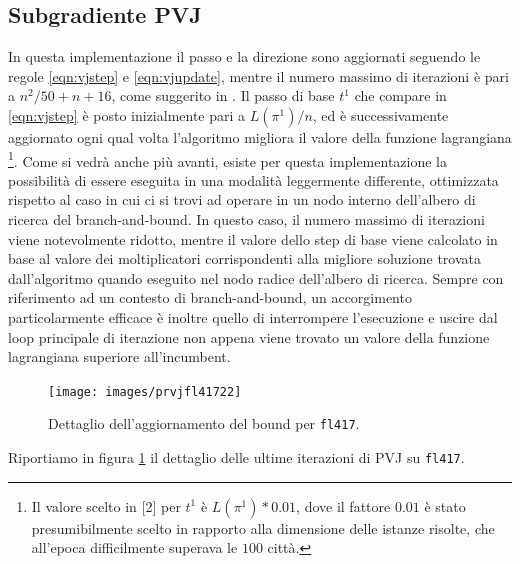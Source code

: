 \subsection{Subgradiente PVJ}
In questa implementazione il passo e la direzione sono aggiornati seguendo le regole \ref{eqn:vjstep} e \ref{eqn:vjupdate}, mentre il numero massimo di iterazioni è pari a $n^2 / 50 + n + 16$, come suggerito in \citep{volgenant1982branch}. Il passo di base $t^1$ che compare in \ref{eqn:vjstep} è posto inizialmente pari a $L(\pi^1) / n$, ed è successivamente aggiornato ogni qual volta l'algoritmo migliora il valore della funzione lagrangiana \footnote{Il valore scelto in [2] per $t^1$ è $L(\pi^1) * 0.01$, dove il fattore $0.01$ è stato presumibilmente scelto in rapporto alla dimensione delle istanze risolte, che all'epoca difficilmente superava le $100$ città.}. Come si vedrà anche più avanti, esiste per questa implementazione la possibilità di essere eseguita in una modalità leggermente differente, ottimizzata rispetto al caso in cui ci si trovi ad operare in un nodo interno dell'albero di ricerca del branch-and-bound. In questo caso, il numero massimo di iterazioni viene notevolmente ridotto, mentre il valore dello step di base viene calcolato in base al valore dei moltiplicatori corrispondenti alla migliore soluzione trovata dall'algoritmo quando eseguito nel nodo radice dell'albero di ricerca. Sempre con riferimento ad un contesto di branch-and-bound, un accorgimento particolarmente efficace è inoltre quello di interrompere l'esecuzione e uscire dal loop principale di iterazione non appena viene trovato un valore della funzione lagrangiana superiore all'incumbent.

\begin{figure}
  \begin{center}
    \texttt{[image: images/prvjfl41722]}
    \caption{Dettaglio dell'aggiornamento del bound per \texttt{fl417}.}
    \label{fig:pvjdettagli}
  \end{center}
\end{figure}

Riportiamo in figura \ref{fig:pvjdettagli} il dettaglio delle ultime iterazioni di PVJ su \texttt{fl417}.

